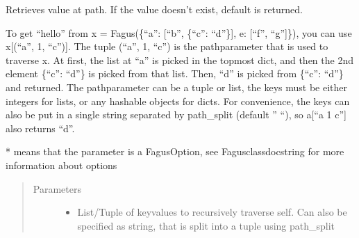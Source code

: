 \documentclass[a4paper,10pt,english]{sphinxmanual}
\begin{document}
\begin{fulllineitems}

\begin{fulllineitems}
\label{\detokenize{fagus.fagus:fagus.fagus.Fagus.get}}
\pysigstartsignatures
{}
\pysigstopsignatures
\sphinxAtStartPar
Retrieves value at path. If the value doesn’t exist, default is returned.

\sphinxAtStartPar
To get “hello” from x = Fagus(\{“a”: {[}“b”, \{“c”: “d”\}{]}, e: {[}“f”, “g”{]}\}), you can use x{[}(“a”, 1, “c”){]}. The tuple
(“a”, 1, “c”) is the path\sphinxhyphen{}parameter that is used to traverse x. At first, the list at “a” is picked in the
top\sphinxhyphen{}most dict, and then the 2nd element \{“c”: “d”\} is picked from that list. Then, “d” is picked from \{“c”: “d”\}
and returned. The path\sphinxhyphen{}parameter can be a tuple or list, the keys must be either integers for lists, or any
hashable objects for dicts. For convenience, the keys can also be put in a single string separated by
path\_split (default ” “), so a{[}“a 1 c”{]} also returns “d”.

\sphinxAtStartPar
* means that the parameter is a FagusOption, see Fagus\sphinxhyphen{}class\sphinxhyphen{}docstring for more information about options
\begin{quote}\begin{description}
\item[{Parameters}] \leavevmode\begin{itemize}
\item {}
\sphinxAtStartPar
{} \textendash{} List/Tuple of key\sphinxhyphen{}values to recursively traverse self. Can also be specified as string, that is split
into a tuple using path\_split


\end{itemize}
\end{description}
\end{quote}
\end{fulllineitems}
\end{fulllineitems}
\end{document}
